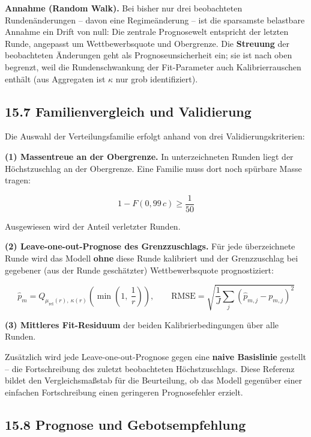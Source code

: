 \documentclass[
  a4paper,
  10pt]{article}
\renewenvironment{quote}
  {\begin{tcolorbox}[
      enhanced,
      breakable,
      colback=Wash,
      colframe=Brand,
      boxrule=0pt,
      leftrule=2.2pt,
      arc=0pt,
      left=8pt,right=8pt,top=6pt,bottom=6pt,
      before skip=8pt,after skip=9pt
    ]\small\color{InkSoft}}
  {\end{tcolorbox}}
\begin{document}
\begin{quote}
\textbf{Annahme (Random Walk).} Bei bisher nur drei beobachteten
Rundenänderungen -- davon eine Regimeänderung -- ist die sparsamste
belastbare Annahme ein Drift von null: Die zentrale Prognosewelt
entspricht der letzten Runde, angepasst um Wettbewerbsquote und
Obergrenze. Die \textbf{Streuung} der beobachteten Änderungen geht als
Prognoseunsicherheit ein; sie ist nach oben begrenzt, weil die
Rundenschwankung der Fit-Parameter auch Kalibrierrauschen enthält (aus
Aggregaten ist \(\kappa\) nur grob identifiziert).
\end{quote}

\hypertarget{familienvergleich-und-validierung}{%
\subsection{15.7 Familienvergleich und
Validierung}\label{familienvergleich-und-validierung}}

Die Auswahl der Verteilungsfamilie erfolgt anhand von drei
Validierungskriterien:

\textbf{(1) Massentreue an der Obergrenze.} In unterzeichneten Runden
liegt der Höchstzuschlag an der Obergrenze. Eine Familie muss dort noch
spürbare Masse tragen:

\[ 1 - F\left(0{,}99\,c\right) \geq \frac{1}{50} \]

Ausgewiesen wird der Anteil verletzter Runden.

\textbf{(2) Leave-one-out-Prognose des Grenzzuschlags.} Für jede
überzeichnete Runde wird das Modell \textbf{ohne} diese Runde kalibriert
und der Grenzzuschlag bei gegebener (aus der Runde geschätzter)
Wettbewerbsquote prognostiziert:

\[ \hat{p}_m = Q_{\mu_{\mathrm{rel}}(r),\ \kappa(r)}\left(\min\left(1,\ \frac{1}{r}\right)\right), \qquad \mathrm{RMSE} = \sqrt{\frac{1}{J}\sum_j \left(\hat{p}_{m,j} - p_{m,j}\right)^2} \]

\textbf{(3) Mittleres Fit-Residuum} der beiden Kalibrierbedingungen über
alle Runden.

Zusätzlich wird jede Leave-one-out-Prognose gegen eine \textbf{naive
Basislinie} gestellt -- die Fortschreibung des zuletzt beobachteten
Höchstzuschlags. Diese Referenz bildet den Vergleichsmaßstab für die
Beurteilung, ob das Modell gegenüber einer einfachen Fortschreibung
einen geringeren Prognosefehler erzielt.

\hypertarget{prognose-und-gebotsempfehlung}{%
\subsection{15.8 Prognose und
Gebotsempfehlung}\label{prognose-und-gebotsempfehlung}}
\end{document}
